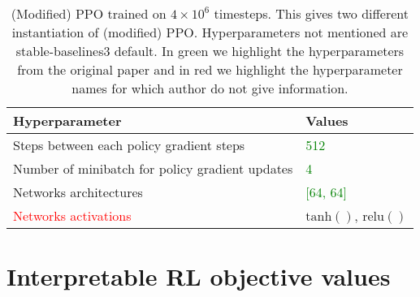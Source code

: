 \begin{table}[H]
    \centering
    \caption{(Modified) PPO trained on $4\times10^6$ timesteps. This gives two different instantiation of (modified) PPO. Hyperparameters not mentioned are stable-baselines3 default. In green we highlight the hyperparameters from the original paper and in red we highlight the hyperparameter names for which author do not give information.}\label{tab:ibmdp-rl2}
    \begin{tabular}{ll}
    \toprule
    \textbf{Hyperparameter} & \textbf{Values}\\
    \midrule
    Steps between each policy gradient steps & \textcolor{green}{512} \\
    Number of minibatch for policy gradient updates & \textcolor{green}{4} \\
    Networks architectures & \textcolor{green}{[64, 64]}\\
    \textcolor{red}{Networks activations} & $\operatorname{tanh()}$, $\operatorname{relu()}$\\
    \bottomrule
    \end{tabular}
    \end{table}

\section{Interpretable RL objective values}\label{calcs}
